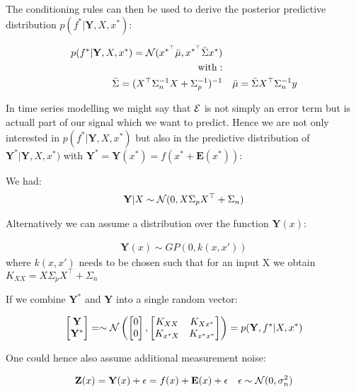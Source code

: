 The conditioning rules can then be used to derive the posterior predictive distribution
$p(f^{\ast} | \mathbf{Y}, X, x^{\ast})$:

\begin{align}
    p(f^{\ast} | \mathbf{Y}, X, x^{\ast}) = \operatorname{\mathcal{N}}(x^{\ast^{\top}} \bar{\mu}, x^{\ast^{\top}} \bar{\Sigma} x^{\ast}) \\
    \text{with}: \\
    \bar{\Sigma} = (X^{\top}\Sigma_n^{-1}X + \Sigma_p^{-1})^{-1} & & \bar{\mu} = \bar{\Sigma} X^{\top} \Sigma_n^{-1} y
\end{align}

In time series modelling we might say that $\operatorname{\mathcal{E}}$ is not simply an error term but is actuall part of our signal which
we want to predict. Hence we are not only interested in $p(f^{\ast} | \mathbf{Y}, X, x^{\ast})$ but also
in the predictive distribution of
$\mathbf{Y^{\ast}} | \mathbf{Y}, X, x^{\ast})$ with $\mathbf{Y^{\ast}} = \mathbf{Y}(x^{\ast}) = f(x^{\ast} + \mathbf{E}(x^{\ast}))$:

We had:
\begin{gather*}
    \mathbf{Y}|X \sim \operatorname{\mathcal{N}}(0,  X \Sigma_p X^{\top} + \Sigma_n) \\
\end{gather*}

Alternatively we can assume a distribution over the function $\mathbf{Y}(x)$:

\begin{gather*}
    \mathbf{Y}(x) \sim GP(0, k(x, x'))
\end{gather*}
where $k(x,x')$ needs to be chosen such that for an input X we obtain $K_{XX} =  X \Sigma_p X^{\top} + \Sigma_n$

If we combine $\mathbf{Y}^{\ast}$ and $\mathbf{Y}$ into a single random vector:

\begin{gather}
    \begin{bmatrix}
        \mathbf{Y} \\
        \mathbf{Y}^{\ast}
    \end{bmatrix} =
    \sim \operatorname{\mathcal{N}} \left(
        \begin{bmatrix}
        0 \\
        0
        \end{bmatrix},
        \begin{bmatrix}
        K_{XX} & K_{Xx^{\ast}} \\
        K_{x^{\ast}X} & K_{x^{\ast}x^{\ast}}
        \end{bmatrix}
        \right)
    = p(\mathbf{Y}, f^{\ast}| X, x^{\ast})
\end{gather}


One could hence also assume additional measurement noise:

\begin{align*}
    \mathbf{Z}(x) = \mathbf{Y}(x) + \epsilon = f(x) + \mathbf{E}(x) + \epsilon  && \epsilon \sim \operatorname{\mathcal{N}}(0, \sigma_n^{2})
\end{align*}





